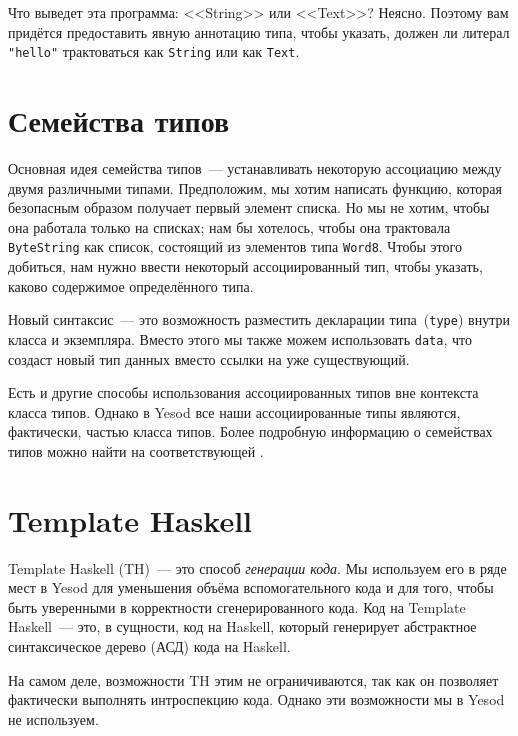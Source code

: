 Что выведет эта программа: <<String>> или <<Text>>? Неясно. Поэтому вам
придётся предоставить явную аннотацию типа, чтобы указать, должен ли литерал
\lstinline'"hello"' трактоваться как \lstinline'String' или как
\lstinline'Text'.

\section{Семейства типов}

Основная идея семейства типов~--- устанавливать некоторую ассоциацию между
двумя различными типами. Предположим, мы хотим написать функцию, которая
безопасным образом получает первый элемент списка. Но мы не хотим, чтобы она
работала только на списках; нам бы хотелось, чтобы она трактовала
\lstinline'ByteString' как список, состоящий из элементов типа
\lstinline'Word8'. Чтобы этого добиться, нам нужно ввести некоторый
ассоциированный тип, чтобы указать, каково содержимое определённого типа.


Новый синтаксис~--- это возможность разместить декларации
типа~(\lstinline'type') внутри класса и экземпляра. Вместо этого мы также можем
использовать \lstinline'data', что создаст новый тип данных вместо ссылки на
уже существующий.

\begin{remark}
Есть и другие способы использования ассоциированных типов вне контекста класса
типов. Однако в Yesod все наши ассоциированные типы являются, фактически,
частью класса типов. Более подробную информацию о семействах типов можно найти
на соответствующей
.
\end{remark}

\section{Template Haskell}

Template Haskell (TH)~--- это способ \emph{генерации кода}. Мы используем его в
ряде мест в Yesod для уменьшения объёма вспомогательного кода и для того, чтобы
быть уверенными в корректности сгенерированного кода. Код на Template
Haskell~--- это, в сущности, код на Haskell, который генерирует абстрактное
синтаксическое дерево (АСД) кода на Haskell.

\begin{remark}
    На самом деле, возможности TH этим не ограничиваются, так как он позволяет
    фактически выполнять интроспекцию кода. Однако эти возможности мы в Yesod
    не используем.
\end{remark}

